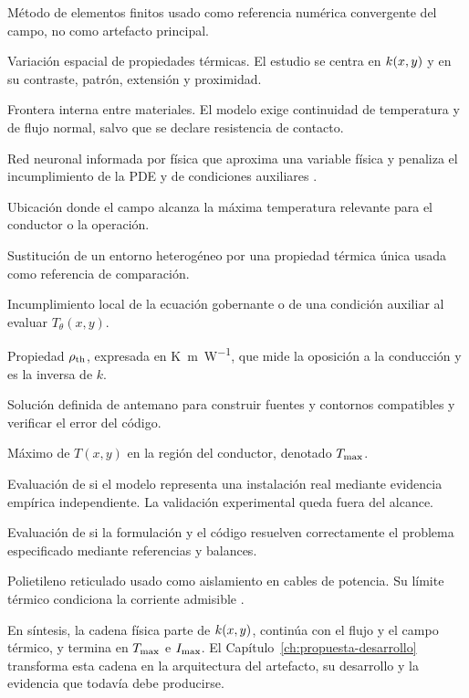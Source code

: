 \begin{description}[style=nextline,itemsep=0.5\baselineskip]
  \item[FEM.] Método de elementos finitos usado como referencia numérica convergente del campo, no como artefacto principal.

  \item[Heterogeneidad térmica.] Variación espacial de propiedades térmicas. El estudio se centra en $k(x,y)$ y en su contraste, patrón, extensión y proximidad.

  \item[Interfaz térmica.] Frontera interna entre materiales. El modelo exige continuidad de temperatura y de flujo normal, salvo que se declare resistencia de contacto.

  \item[PINN.] Red neuronal informada por física que aproxima una variable física y penaliza el incumplimiento de la PDE y de condiciones auxiliares \parencite{raissi2019}.

  \item[Punto caliente.] Ubicación donde el campo alcanza la máxima temperatura relevante para el conductor o la operación.

  \item[Representación homogénea equivalente.] Sustitución de un entorno heterogéneo por una propiedad térmica única usada como referencia de comparación.

  \item[Residuo físico.] Incumplimiento local de la ecuación gobernante o de una condición auxiliar al evaluar $T_\theta(x,y)$.

  \item[Resistividad térmica.] Propiedad $\rho_{\mathrm{th}}$, expresada en \si{\kelvin\metre\per\watt}, que mide la oposición a la conducción y es la inversa de $k$.

  \item[Solución manufacturada.] Solución definida de antemano para construir fuentes y contornos compatibles y verificar el error del código.

  \item[Temperatura máxima del conductor.] Máximo de $T(x,y)$ en la región del conductor, denotado $T_{\max}$.

  \item[Validación.] Evaluación de si el modelo representa una instalación real mediante evidencia empírica independiente. La validación experimental queda fuera del alcance.

  \item[Verificación.] Evaluación de si la formulación y el código resuelven correctamente el problema especificado mediante referencias y balances.

  \item[XLPE.] Polietileno reticulado usado como aislamiento en cables de potencia. Su límite térmico condiciona la corriente admisible \parencite{iec60502_2_2014}.
\end{description}

En síntesis, la cadena física parte de $k(x,y)$, continúa con el flujo y el campo térmico, y termina en $T_{\max}$ e $I_{\max}$. El Capítulo~\ref{ch:propuesta-desarrollo} transforma esta cadena en la arquitectura del artefacto, su desarrollo y la evidencia que todavía debe producirse.

